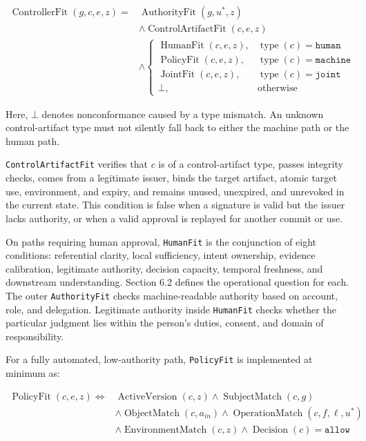 \[
\begin{aligned}
\operatorname{ControllerFit}(g,c,e,z)={}&
\operatorname{AuthorityFit}(g,u^{\ast},z)\\
&\land \operatorname{ControlArtifactFit}(c,e,z)\\
&\land
\begin{cases}
\operatorname{HumanFit}(c,e,z), & \operatorname{type}(c)=\texttt{human} \\
\operatorname{PolicyFit}(c,e,z), & \operatorname{type}(c)=\texttt{machine} \\
\operatorname{JointFit}(c,e,z), & \operatorname{type}(c)=\texttt{joint} \\
\bot, & \text{otherwise}
\end{cases}
\end{aligned}
\]

Here, \(\bot\) denotes nonconformance caused by a type mismatch. An unknown control-artifact type must not silently fall back to either the machine path or the human path.

\passthrough{\lstinline!ControlArtifactFit!} verifies that \(c\) is of a control-artifact type, passes integrity checks, comes from a legitimate issuer, binds the target artifact, atomic target use, environment, and expiry, and remains unused, unexpired, and unrevoked in the current state. This condition is false when a signature is valid but the issuer lacks authority, or when a valid approval is replayed for another commit or use.

On paths requiring human approval, \passthrough{\lstinline!HumanFit!} is the conjunction of eight conditions: referential clarity, local sufficiency, intent ownership, evidence calibration, legitimate authority, decision capacity, temporal freshness, and downstream understanding. Section 6.2 defines the operational question for each. The outer \passthrough{\lstinline!AuthorityFit!} checks machine-readable authority based on account, role, and delegation. Legitimate authority inside \passthrough{\lstinline!HumanFit!} checks whether the particular judgment lies within the person's duties, consent, and domain of responsibility.

For a fully automated, low-authority path, \passthrough{\lstinline!PolicyFit!} is implemented at minimum as:

\[
\begin{aligned}
\operatorname{PolicyFit}(c,e,z)\iff{}&
\operatorname{ActiveVersion}(c,z)
\land \operatorname{SubjectMatch}(c,g)\\
&\land \operatorname{ObjectMatch}(c,a_{in})
\land \operatorname{OperationMatch}(c,f,\ell,u^{\ast})\\
&\land \operatorname{EnvironmentMatch}(c,z)
\land \operatorname{Decision}(c)=\texttt{allow}
\end{aligned}
\]


